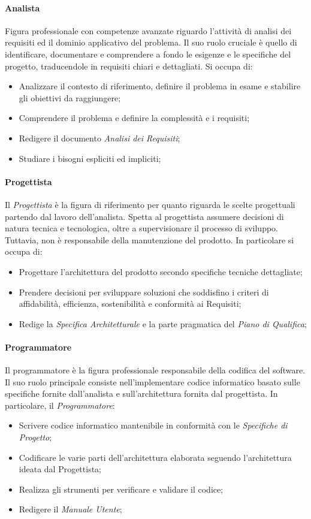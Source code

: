 \paragraph{Analista}\label{analista}Figura professionale con competenze avanzate riguardo l'attività di analisi dei requisiti ed il dominio applicativo del problema. Il suo ruolo cruciale è quello di identificare, documentare e comprendere a fondo le esigenze e le specifiche del progetto, traducendole in requisiti chiari e dettagliati. Si occupa di:
\begin{itemize}
    \item Analizzare il contesto di riferimento, definire il problema in esame e stabilire gli obiettivi da raggiungere;
    \item Comprendere il problema e definire la complessità e i requisiti;
    \item Redigere il documento \textit{Analisi dei Requisiti};
    \item Studiare i bisogni espliciti ed impliciti;
\end{itemize}
\paragraph{Progettista}\label{progettista}Il \textit{Progettista} è la figura di riferimento per quanto riguarda le scelte progettuali partendo dal lavoro dell'analista. Spetta al progettista assumere decisioni di natura tecnica e tecnologica, oltre a supervisionare il processo di sviluppo. Tuttavia, non è responsabile della manutenzione del prodotto. In particolare si occupa di:
\begin{itemize}
    \item Progettare l'architettura del prodotto secondo specifiche tecniche dettagliate;
    \item Prendere decisioni per sviluppare soluzioni che soddisfino i criteri di affidabilità, efficienza, sostenibilità e conformità ai Requisiti;
    \item Redige la \textit{Specifica Architetturale} e la parte pragmatica del \textit{Piano di Qualifica};
\end{itemize}
\paragraph{Programmatore}\label{programmatore}Il programmatore è la figura professionale responsabile della codifica del software. Il suo ruolo principale consiste nell'implementare codice informatico basato sulle specifiche fornite dall'analista e sull'architettura fornita dal progettista. In particolare, il \textit{Programmatore}:
\begin{itemize}
    \item Scrivere codice informatico mantenibile in conformità con le \textit{Specifiche di Progetto};
    \item Codificare le varie parti dell'architettura elaborata seguendo l'architettura ideata dal Progettista;
    \item Realizza gli strumenti per verificare e validare il codice;
    \item Redigere il \textit{Manuale Utente};
\end{itemize}
